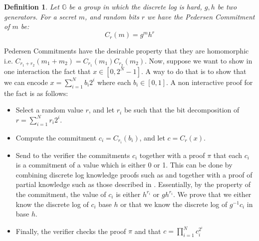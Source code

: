 \documentclass{article}
\newtheorem{definition}{Definition}
\begin{document}
\begin{definition}
    Let $\mathbb{G}$ be a group in which the discrete log is hard, $g, h$ be two generators. 
    For a secret $m$, and random bits $r$ we have the Pedersen Commitment of $m$ be:
    \[ C_r(m) = g^m h^r \]
\end{definition}
Pedersen Commitments have the desirable property that they are homomorphic i.e. $C_{r_1 + r_2}(m_1 + m_2) = C_{r_1}(m_1) C_{r_2}(m_2)$.
Now, suppose we want to show in one interaction the fact that $x \in [0, 2^N -1]$. A way to do that is to show
that we can encode $x =\sum^N_{i=1} b_i 2^i$ where each $b_i \in [0, 1]$. A non interactive proof \cite{maoGuaranteedCorrectSharing1998b} for the fact is as follows:
\begin{itemize}
    \item Select a random value $r$, and let $r_i$ be such that the bit decomposition of $r = \sum_{i = 1}^N r_i 2^i$.
    \item Compute the commitment $c_i = C_{r_i}(b_i)$, and let $c = C_r(x)$.
    \item Send to the verifier the commitments $c_i$ together with a proof $\pi$ that each $c_i$ is a commitment of a value which is either 0 or 1. This can 
    be done by combining discrete log knowledge proofs such as \cite{schnorrEfficientSignatureGeneration1991} and together with a proof of partial knowledge such as those
    described in \cite{cramerProofsPartialKnowledge1994}. Essentially, by the property of the commitment, the value 
    of $c_i$ is either $h^{r_i}$ or $g h^{r_i}$. We prove that we either know the discrete log of $c_i$ base $h$ or that we know 
    the discrete log of $g^{-1} c_i$ in base $h$.
    \item Finally, the verifier checks the proof $\pi$ and that $c = \prod_{i=1}^N c_i^{2^i}$
\end{itemize}
\end{document}
